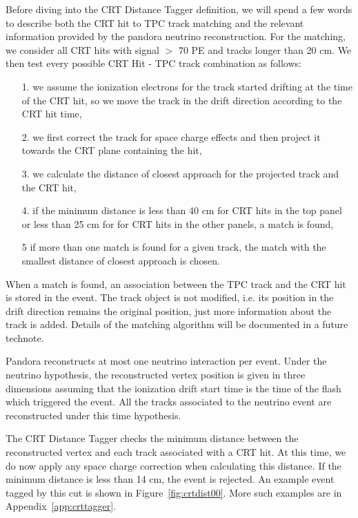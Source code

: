 Before diving into the CRT Distance Tagger definition, we will spend a few words to describe both the CRT hit to TPC track matching and the relevant information provided by the pandora neutrino reconstruction. For the matching, we consider all CRT hits with signal $>$ 70 PE  and tracks longer than 20 cm. We then test every possible CRT Hit - TPC track combination as follows: 
\begin{itemize}
\item[1.] we assume the ionization electrons for the track started drifting at the time of the CRT hit, so we move the track in the drift direction according to the CRT hit time, 
\item [2.] we first correct the track for space charge effects and then project it towards the CRT plane containing the hit,
\item [3.] we calculate the distance of closest approach for the projected track and the CRT hit,
\item [4.] if the minimum distance is less than 40 cm for CRT hits in the top panel or less than 25 cm for  for CRT hits in the other panels, a match is found,
\item[5]if more than one match is found for a given track, the match with the smallest distance of closest approach is chosen. 
\end{itemize}

When a match is found, an association between the TPC track and the CRT hit is stored in the event. The track object is not modified, i.e. its position in the drift direction remains the original position, just more information about the track is added. Details of the matching algorithm will be documented  in a future technote.


Pandora reconstructs at most one neutrino interaction per event. Under the neutrino hypothesis, the reconstructed vertex position is given in three dimensions assuming that the ionization drift start time is the time of the flash which triggered the event. All the tracks associated to the neutrino event are reconstructed under this time hypothesis. 

The CRT Distance Tagger checks the minimum distance between the reconstructed vertex and each track associated with a CRT hit. At this time, we do now apply any space charge correction when calculating this distance.  If the minimum distance is less than 14 cm, the event is rejected. An example event tagged by this cut is shown in Figure~\ref{fig:crtdist00}. More such examples are in Appendix~\ref{app:crttagger}.

